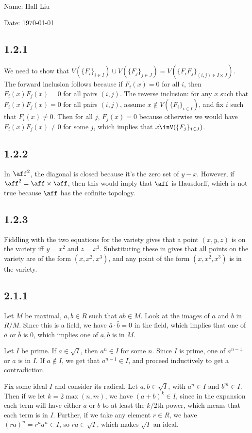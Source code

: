 \documentclass{article}
\begin{document}
Name: Hall Liu

Date: \today 
\vspace{1.5cm}
\subsection*{1.2.1}
We need to show that $V(\{F_i\}_{i\in I})\cup V(\{F_j\}_{j\in J})=V(\{F_iF_j\}_{(i,j)\in I\times J})$. The forward inclusion follows because if $F_i(x)=0$ for all $i$, then $F_i(x)F_j(x)=0$ for all pairs $(i,j)$. The reverse inclusion: for any $x$ such that $F_i(x)F_j(x)=0$ for all pairs $(i,j)$, assume $x\not\in V(\{F_i\}_{i\in I})$, and fix $i$ such that $F_i(x)\neq0$. Then for all $j$, $F_j(x)=0$ because otherwise we would have $F_i(x)F_j(x)\neq0$ for some $j$, which implies that $x\inV(\{F_j\}_{j\in J})$.
\subsection*{1.2.2}
In $\aff^2$, the diagonal is closed because it's the zero set of $y-x$. However, if $\aff^2=\aff\times\aff$, then this would imply that $\aff$ is Hausdorff, which is not true because $\aff$ has the cofinite topology.
\subsection*{1.2.3}
Fiddling with the two equations for the variety gives that a point $(x,y,z)$ is on the variety iff $y=x^2$ and $z=x^3$. Substituting these in gives that all points on the variety are of the form $(x,x^2,x^3)$, and any point of the form $(x,x^2,x^3)$ is in the variety.
\subsection*{2.1.1}
Let $M$ be maximal, $a,b\in R$ such that $ab\in M$. Look at the images of $a$ and $b$ in $R/M$. Since this is a field, we have $\bar{a}\cdot\bar{b}=0$ in the field, which implies that one of $\bar{a}$ or $\bar{b}$ is $0$, which implies one of $a,b$ is in $M$.

Let $I$ be prime. If $a\in\sqrt{I}$, then $a^n\in I$ for some $n$. Since $I$ is prime, one of $a^{n-1}$ or $a$ is in $I$. If $a\not\in I$, we get that $a^{n-1}\in I$, and proceed inductively to get a contradiction.

Fix some ideal $I$ and consider its radical. Let $a,b\in\sqrt{I}$, with $a^n\in I$ and $b^m\in I$. Then if we let $k=2\max(n,m)$, we have $(a+b)^k\in I$, since in the expansion each term will have either $a$ or $b$ to at least the $k/2$th power, which means that each term is in $I$. Further, if we take any element $r\in R$, we have $(ra)^n=r^na^n\in I$, so $ra\in\sqrt{I}$, which makes $\sqrt{I}$ an ideal.
\end{document}
